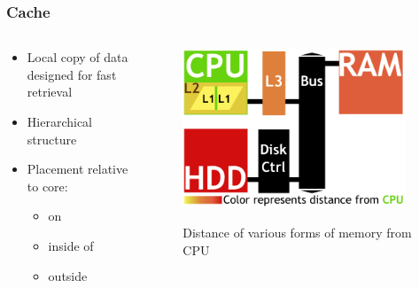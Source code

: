 \documentclass{beamer}
\newcommand{\linespace}{\vskip 0.25cm}
\begin{document}
\begin{frame}
\frametitle{Cache}

\begin{columns}
\begin{column}{0.5\textwidth}
\begin{itemize}
	\item Local copy of data designed for fast retrieval
	\item Hierarchical structure %
	\linespace
	\item Placement relative to core:
	\begin{itemize}
		\item on
		\item inside of
		\item outside

	\end{itemize}
\end{itemize}

\end{column}
\begin{column}{0.5\textwidth}
		\begin{figure}
		\includegraphics[width=0.95\textwidth]{Illustrations/CacheAbstract}
		\label{fig:domains}
		\caption{Distance of various forms of memory from CPU}
		\end{figure}
	\end{column}
\end{columns}
\end{frame}
\end{document}
